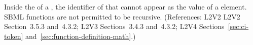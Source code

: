 Inside the  of a \FunctionDefinition, the identifier of that
\FunctionDefinition cannot appear as the value of a  element.
SBML functions are not permitted to be recursive.  (References: L2V2
L2V2 Section~3.5.3 and~4.3.2; L2V3 Sections~3.4.3 and~4.3.2; L2V4 Sections~\ref{sec:ci-token}
and~\ref{sec:function-definition-math}.)
